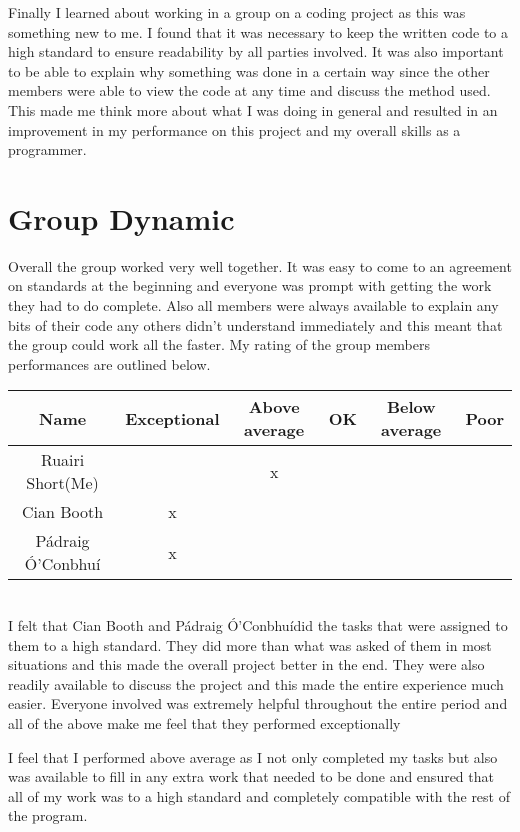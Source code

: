 \documentclass[12pt]{article}    %
\numberwithin{equation}{section}
\newcommand{\pa}{P\'{a}draig \'{O}'Conbhu\'{i}}
\begin{document}
Finally I learned about working in a group on a coding project as this was something new to me.
I found that it was necessary to keep the written code to a high standard to ensure readability by all parties involved.
It was also important to be able to explain why something was done in a certain way since the other members were able to view the code at any time and discuss the method used.
This made me think more about what I was doing in general and resulted in an improvement in my performance on this project and my overall skills as a programmer.


\section{Group Dynamic}
Overall the group worked very well together. 
It was easy to come to an agreement on standards at the beginning and everyone was prompt with getting the work they had to do complete.
Also all members were always available to explain any bits of their code any others didn't understand immediately and this meant that the group could work all the faster.
My rating of the group members performances are outlined below.

\begin{tabular}{|c|c|c|c|c|c|}
\hline
Name & Exceptional & Above average & OK & Below average & Poor\\
\hline\hline
Ruairi Short(Me) & & x& & &\\ 
\hline
Cian Booth & x& & & &\\
\hline
\pa & x& & & &\\
\hline
\end{tabular}
\\
I felt that Cian Booth and \pa did the tasks that were assigned to them to a high standard.
They did more than what was asked of them in most situations and this made the overall project better in the end.
They were also readily available to discuss the project and this made the entire experience much easier.
Everyone involved was extremely helpful throughout the entire period and all of the above make me feel that they performed exceptionally

I feel that I performed above average as I not only completed my tasks but also was available to fill in any extra work that needed to be done and ensured that all of my work was to a high standard and completely compatible with the rest of the program.
\end{document}
